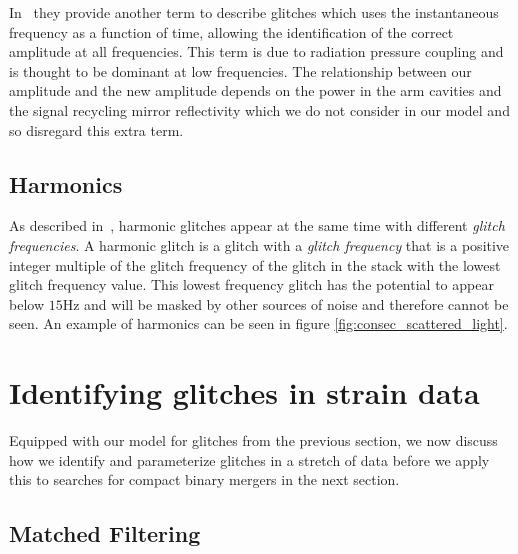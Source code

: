 In~\cite{MichalSub} they provide another term to describe \scl{} glitches which uses the instantaneous frequency as a function of time, allowing the identification of the correct amplitude at all frequencies. This term is due to radiation pressure coupling and is thought to be dominant at low frequencies. The relationship between our amplitude and the new amplitude depends on the power in the arm cavities and the signal recycling mirror reflectivity which we do not consider in our model and so disregard this extra term.

\subsection{Harmonics}

As described in~\cite{TAccadia}, harmonic glitches appear at the same time with different \emph{glitch frequencies}. A harmonic glitch is a glitch with a \emph{glitch frequency} that is a positive integer multiple of the glitch frequency of the glitch in the stack with the lowest glitch frequency value. This lowest frequency glitch has the potential to appear below $15$Hz and will be masked by other sources of noise and therefore cannot be seen. An example of harmonics can be seen in figure \ref{fig:consec_scattered_light}.

\section{\label{sec:search_techniques}Identifying \scl{} glitches in \gw{} strain data}

Equipped with our model for \scl{} glitches from the previous section, we now discuss how we identify and parameterize \scl{} glitches in a stretch of \gw{} data before we apply this to searches for compact binary mergers in the next section. 

\subsection{Matched Filtering \label{subsec:MF}}

